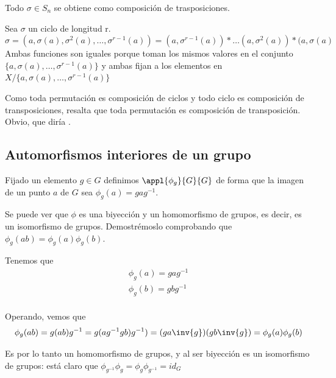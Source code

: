 \documentclass[nochap]{apuntes}
\begin{document}
\begin{theorem}
Todo $\sigma \in S_n$ se obtiene como composición de trasposiciones.
\end{theorem}

\begin{example}
Sea $\sigma$ un ciclo de longitud r. \\
$\sigma = ( a, \sigma (a), \sigma ^2(a), \hdots, \sigma ^{r-1}(a)) =
(a, \sigma ^{r-1}(a))\ast \hdots (a, \sigma ^2(a)) \ast(a, \sigma (a) $
\\Ambas funciones son iguales porque toman los mismos valores en el conjunto \\ $\{a, \sigma (a),\hdots , \sigma ^{r-1} (a) \}$ y ambas fijan a los elementos en $X / \{a, \sigma (a),\hdots , \sigma ^{r-1} (a) \}$ 
\end{example}

\obs Como toda permutación es composición de ciclos y todo ciclo es composición de transposiciones, resalta que toda permutación es composición de transposición. Obvio, que diría \href{http://www.uam.es/personal_pdi/ciencias/dyakubov/dimitry.jpg}{\color{blue}{Dmitry}}.


\subsection{Automorfismos interiores de un grupo}

Fijado un elemento $g\in G$ definimos $\appl{\phi _g}{G}{G}$ de forma que la imagen
de un punto $a$ de $G$ sea $\phi _g(a) = gag^{-1}$.

Se puede ver que $\phi$ es una biyección y un homomorfismo de grupos, es decir, es un isomorfismo de grupos. Demostrémoslo comprobando que $\phi_g(ab) = \phi_g(a)\phi_g(b)$. 

Tenemos que
\begin{gather*}
\phi _g (a) = g a g^{-1}\\
\phi _g (b) = g b g^{-1}\\
\end{gather*}

Operando, vemos que
\[ \phi _g (a b) = g (a b) g^{-1} = g (a g^{-1} g b) g^{-1}) = (ga\inv{g}) (g b \inv{g}) = \phi _g (a) \phi _g(b) \]

Es por lo tanto un homomorfismo de grupos, y al ser biyección es un isomorfismo de grupos: está claro que $\phi _{g^{-1}} \phi _g = \phi _g \phi _{g^{-1}} = id_G$
\end{document}
